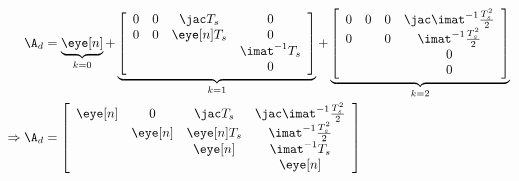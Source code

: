 \begin{align}
  \A_d &= \underbrace{\eye[ n ]}_{k=0} + \underbrace{\left[
         \begin{array}{cccc}
           0 & 0 & \jac T_s & 0 \\
           0 & 0 & \eye[ n ] T_s & 0 \\
             &&& \imat^{-1} T_s \\
             &&& 0
         \end{array}\right]}_{k=1} + \underbrace{\left[
                 \begin{array}{cccc}
                   0 & 0 & 0 & \jac \imat^{-1} \frac{T_s^2}{2}\\
                   0 & & 0 & \imat^{-1} \frac{T_s^2}{2} \\
                     &&& 0 \\
                     &&& 0
                 \end{array}\right]}_{k=2} \\
  \Rightarrow \A_d &= \left[
                     \begin{array}{cccc}
                       \eye[ n ] & 0 & \jac T_s & \jac \imat^{-1} \frac{T_s^2}{2} \\
                               & \eye[ n ] & \eye[ n ] T_s & \imat^{-1} \frac{T_s^2}{2} \\
                               &&\eye[ n ]& \imat^{-1} T_s \\
                               &&& \eye[ n ]
                     \end{array}\right]
\end{align}

